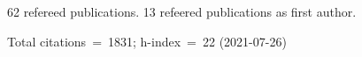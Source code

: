 62 refereed publications. 13 refeered publications as first author.

Total citations~=~1831; h-index~=~22 (2021-07-26)